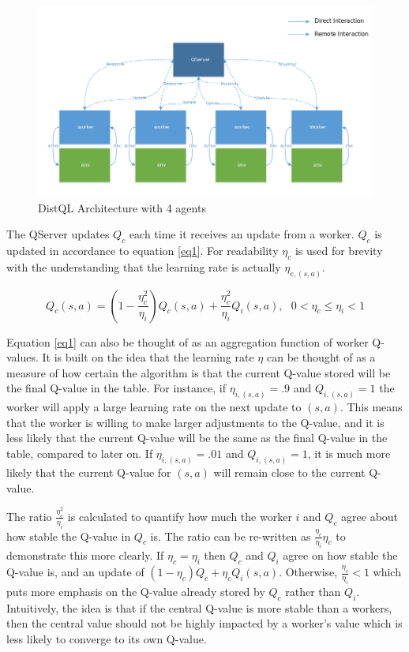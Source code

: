 \documentclass[jair,twoside,11pt,theapa]{article}
\begin{document}
\begin{figure}[h]
\centering
\includegraphics[width=0.8\linewidth]{"DistQL Architecture-modified"}
\caption{DistQL Architecture with 4 agents}
\label{fig:DistQLArchitecture}
\end{figure}

The QServer updates $Q_c$ each time it receives an update from a worker. $Q_c$ is updated in accordance to equation \ref{eq1}. For readability $\eta_c$ is used for brevity with the understanding that the learning rate is actually $\eta_{c,(s,a)}$.

\begin{equation}
\label{eq1}
Q_c(s,a) = (1-\frac{\eta_{c}^{2}}{\eta_{i}})Q_c(s,a) + \frac{\eta_{c}^{2}}{\eta_{i}} Q_i(s,a), \text{  } 0 < \eta_{c} \leq \eta_{i} < 1
\end{equation}

Equation \ref{eq1} can also be thought of as an aggregation function of worker Q-values. It is built on the idea that the learning rate $\eta$ can be thought of as a measure of how certain the algorithm is that the current Q-value stored will be the final Q-value in the table. For instance, if $\eta_{i,(s,a)} = .9$ and $Q_{i,(s,a)} = 1$ the worker will apply a large learning rate on the next update to $(s,a)$. This means that the worker is willing to make larger adjustments to the Q-value, and it is less likely that the current Q-value will be the same as the final Q-value in the table, compared to later on. If $\eta_{i,(s,a)} = .01$ and $Q_{i,(s,a)} = 1$, it is much more likely that the current Q-value for $(s,a)$ will remain close to the current Q-value. 

The ratio $\frac{\eta_{c}^{2}}{\eta_{i}}$ is calculated to quantify how much the worker $i$ and $Q_c$ agree about how stable the Q-value in $Q_c$ is. The ratio can be re-written as $\frac{\eta_{c}}{\eta_{i}} \eta_{c}$ to demonstrate this more clearly. If $\eta_{c} = \eta_{i}$ then $Q_c$ and $Q_i$ agree on how stable the Q-value is, and an update of $(1-\eta_{c})Q_c + \eta_{c} Q_i(s,a)$. Otherwise, $\frac{\eta_c}{\eta_i} < 1$ which puts more emphasis on the Q-value already stored by $Q_c$ rather than $Q_i$. Intuitively, the idea is that if the central Q-value is more stable than a workers, then the central value should not be highly impacted by a worker's value which is less likely to converge to its own Q-value.
\end{document}
